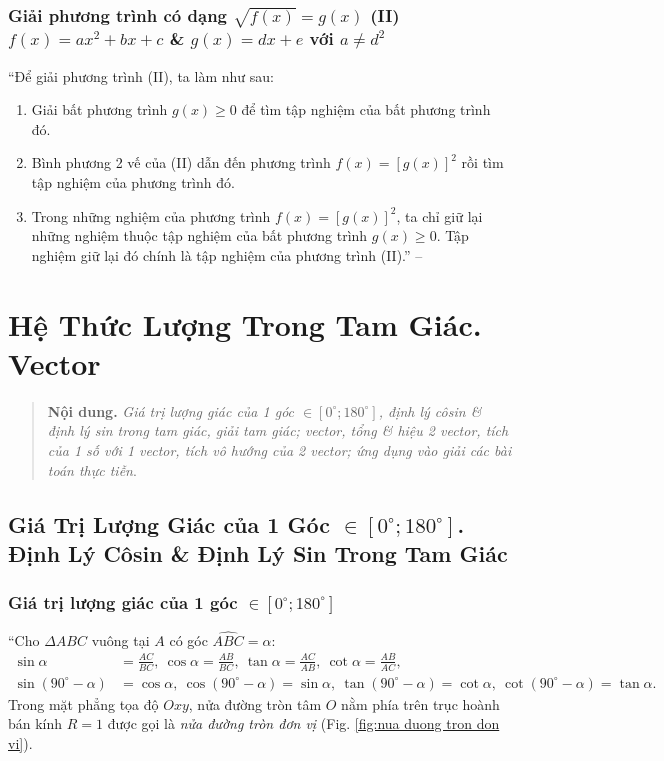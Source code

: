 \documentclass[oneside]{book}
\numberwithin{equation}{section}
\begin{document}
\subsection{Giải phương trình có dạng $\sqrt{f(x)} = g(x)$ (II) $f(x) = ax^2 + bx + c$ \& $g(x) = dx + e$ với $a\ne d^2$}
``Để giải phương trình (II), ta làm như sau:
\begin{enumerate}
	\item Giải bất phương trình $g(x)\ge 0$ để tìm tập nghiệm của bất phương trình đó.
	\item Bình phương 2 vế của (II) dẫn đến phương trình $f(x) = [g(x)]^2$ rồi tìm tập nghiệm của phương trình đó.
	\item Trong những nghiệm của phương trình $f(x) = [g(x)]^2$, ta chỉ giữ lại những nghiệm thuộc tập nghiệm của bất phương trình $g(x)\ge 0$. Tập nghiệm giữ lại đó chính là tập nghiệm của phương trình (II).'' -- \cite[p. 57]{SGK_Toan_10_Canh_Dieu_tap_1}
\end{enumerate}


\chapter{Hệ Thức Lượng Trong Tam Giác. Vector}

\begin{quotation}
	\textbf{Nội dung.} \textit{Giá trị lượng giác của 1 góc $\in[0^\circ;180^\circ]$, định lý côsin \& định lý sin trong tam giác, giải tam giác; vector, tổng \& hiệu 2 vector, tích của 1 số với 1 vector, tích vô hướng của 2 vector; ứng dụng vào giải các bài toán thực tiễn}.
\end{quotation}

\section{Giá Trị Lượng Giác của 1 Góc $\in[0^\circ;180^\circ]$. Định Lý Côsin \& Định Lý Sin Trong Tam Giác}

\subsection{Giá trị lượng giác của 1 góc $\in[0^\circ;180^\circ]$}
``Cho $\Delta ABC$ vuông tại $A$ có góc $\widehat{ABC} = \alpha$:
\begin{align*}
	\sin\alpha &= \frac{AC}{BC},\ \cos\alpha = \frac{AB}{BC},\ \tan\alpha = \frac{AC}{AB},\ \cot\alpha = \frac{AB}{AC},\\
	\sin(90^\circ - \alpha) &= \cos\alpha,\ \cos(90^\circ - \alpha) = \sin\alpha,\ \tan(90^\circ - \alpha) = \cot\alpha,\ \cot(90^\circ - \alpha) = \tan\alpha.
\end{align*}
Trong mặt phẳng tọa độ $Oxy$, nửa đường tròn tâm $O$ nằm phía trên trục hoành bán kính $R = 1$ được gọi là \textit{nửa đường tròn đơn vị} (Fig. \ref{fig:nua duong tron don vi}). 
\end{document}
